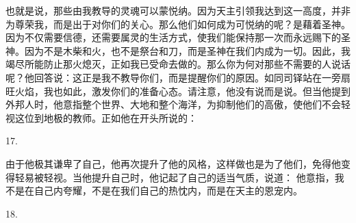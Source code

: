 也就是说，那些由我教导的灵魂可以蒙悦纳。因为天主引领我达到这一高度，并非为尊荣我，而是出于对你们的关心。那么他们如何成为可悦纳的呢？是藉着圣神。因为不仅需要信德，还需要属灵的生活方式，使我们能保持那一次而永远赐下的圣神。因为不是木柴和火，也不是祭台和刀，而是圣神在我们内成为一切。因此，我竭尽所能防止那火熄灭，正如我已受命去做的。那么你为何对那些不需要的人说话呢？他回答说：这正是我不教导你们，而是提醒你们的原因。如同司铎站在一旁扇旺火焰，我也如此，激发你们的准备心态。请注意，他没有说而是说。但当他提到外邦人时，他意指整个世界、大地和整个海洋，为抑制他们的高傲，使他们不会轻视这位到地极的教师。正如他在开头所说的： \par

17.  \par

由于他极其谦卑了自己，他再次提升了他的风格，这样做也是为了他们，免得他变得轻易被轻视。当他提升自己时，他记起了自己的适当气质，说道： 他意指，我不是在自己内夸耀，不是在我们自己的热忱内，而是在天主的恩宠内。\par

18.  \par

